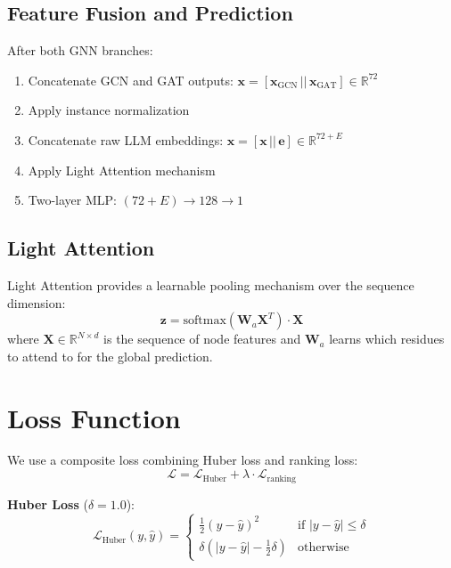\subsection{Feature Fusion and Prediction}

After both GNN branches:
\begin{enumerate}
    \item Concatenate GCN and GAT outputs: $\mathbf{x} = [\mathbf{x}_{\text{GCN}} \,||\, \mathbf{x}_{\text{GAT}}] \in \mathbb{R}^{72}$
    \item Apply instance normalization
    \item Concatenate raw LLM embeddings: $\mathbf{x} = [\mathbf{x} \,||\, \mathbf{e}] \in \mathbb{R}^{72 + E}$
    \item Apply Light Attention mechanism
    \item Two-layer MLP: $(72 + E) \rightarrow 128 \rightarrow 1$
\end{enumerate}

\subsection{Light Attention}

Light Attention \cite{starklight} provides a learnable pooling mechanism over the sequence dimension:
\begin{equation}
    \mathbf{z} = \text{softmax}(\mathbf{W}_a \mathbf{X}^T) \cdot \mathbf{X}
\end{equation}
where $\mathbf{X} \in \mathbb{R}^{N \times d}$ is the sequence of node features and $\mathbf{W}_a$ learns which residues to attend to for the global prediction.

\section{Loss Function}

We use a composite loss combining Huber loss and ranking loss:
\begin{equation}
    \mathcal{L} = \mathcal{L}_{\text{Huber}} + \lambda \cdot \mathcal{L}_{\text{ranking}}
\end{equation}

\textbf{Huber Loss} ($\delta = 1.0$):
\begin{equation}
    \mathcal{L}_{\text{Huber}}(y, \hat{y}) = \begin{cases}
        \frac{1}{2}(y - \hat{y})^2 & \text{if } |y - \hat{y}| \leq \delta \\
        \delta(|y - \hat{y}| - \frac{1}{2}\delta) & \text{otherwise}
    \end{cases}
\end{equation}

